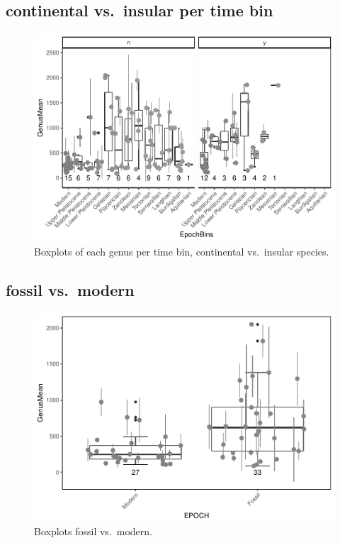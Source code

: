 \documentclass[]{article}
\begin{document}
\newpage

\subsection{continental vs.~insular per time
bin}\label{continental-vs.insular-per-time-bin}

\begin{figure}[htbp]
\centering
\includegraphics{MA_JJ_files/figure-latex/Boxplots of each genus per time bin, continental vs. insular-1.pdf}
\caption{Boxplots of each genus per time bin, continental vs.~insular
species.}
\end{figure}

\newpage

\subsection{fossil vs.~modern}\label{fossil-vs.modern}

\begin{figure}[htbp]
\centering
\includegraphics{MA_JJ_files/figure-latex/Boxplots modern vs. fossil-1.pdf}
\caption{Boxplots fossil vs.~modern.}
\end{figure}
\end{document}
